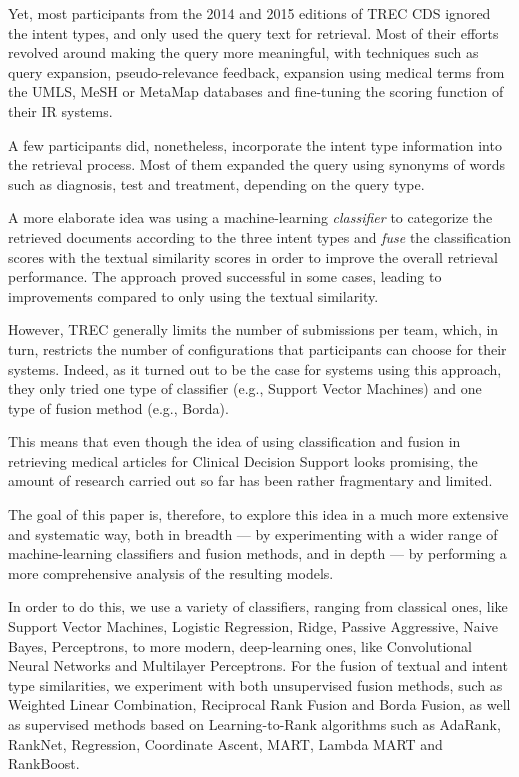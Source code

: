 Yet, most participants from the 2014 and 2015 editions of TREC CDS ignored the intent types,
and only used the query text for retrieval.
Most of their efforts revolved around making the query more meaningful, with techniques
such as query expansion, pseudo-relevance feedback, expansion using medical terms from the UMLS, MeSH or MetaMap databases and
fine-tuning the scoring function of their IR systems.

A few participants did, nonetheless, incorporate the intent type information into the retrieval process. Most of them
 expanded the query using synonyms of words such as diagnosis, test and treatment, depending on the query type.

A more elaborate idea was using a machine-learning \emph{classifier} to categorize the retrieved documents according
to the three intent types and \emph{fuse} the classification scores
with the textual similarity scores in order to improve the overall retrieval performance.
The approach proved successful in some cases, leading to improvements compared to only using the textual similarity.

However, TREC generally limits the number of submissions per team, which, in turn, restricts
the number of configurations that participants can choose for their systems.
Indeed, as it turned out to be the case for systems using this approach,
they only tried one type of classifier (e.g., Support Vector Machines)
and one type of fusion method (e.g., Borda).

This means that even though the idea of using classification and fusion
in retrieving medical articles for Clinical Decision Support looks promising,
the amount of research carried out so far has been rather fragmentary and limited.

The goal of this paper is, therefore, to
explore this idea in a much more extensive and systematic way, both in breadth --- by experimenting
with a wider range of machine-learning classifiers and fusion methods,
and in depth --- by performing a more comprehensive analysis of the resulting models.

In order to do this, we use a variety of classifiers, ranging from classical ones, like Support Vector Machines,
Logistic Regression, Ridge, Passive Aggressive, Naive Bayes, Perceptrons,
to more modern, deep-learning ones, like Convolutional Neural Networks and Multilayer Perceptrons.
For the fusion of textual and intent type similarities,
we experiment with both unsupervised fusion methods, such as Weighted Linear Combination, Reciprocal Rank Fusion and Borda Fusion,
as well as supervised methods based
on Learning-to-Rank algorithms such as AdaRank, RankNet, Regression, Coordinate Ascent, MART, Lambda MART and RankBoost.

